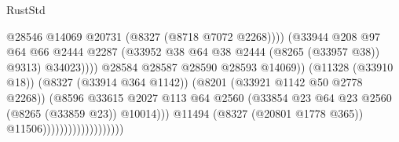 \begin{lexlean}{RustStd}
\begin{coremodule}
                                                          @28546
                                                          @14069
                                                          @20731
                                                          (@8327 (@8718 @7072 @2268))))
                                                      (@33944
                                                        @208
                                                        @97
                                                        @64
                                                        @66
                                                        @2444
                                                        @2287
                                                        (@33952
                                                          @38
                                                          @64
                                                          @38
                                                          @2444
                                                          (@8265 (@33957 @38))
                                                          @9313)
                                                        @34023))))
                                                @28584
                                                @28587
                                                @28590
                                                @28593
                                                @14069))
                                            (@11328 (@33910 @18))
                                            (@8327 (@33914 @364 @1142))
                                            (@8201 (@33921 @1142 @50 @2778 @2268))
                                            (@8596
                                              @33615
                                              @2027
                                              @113
                                              @64
                                              @2560
                                              (@33854
                                                @23
                                                @64
                                                @23
                                                @2560
                                                (@8265 (@33859 @23))
                                                @10014)))
                                          @11494
                                          (@8327 (@20801 @1778 @365))
                                          @11506)))))))))))))))))))

\end{coremodule}
\end{lexlean}
